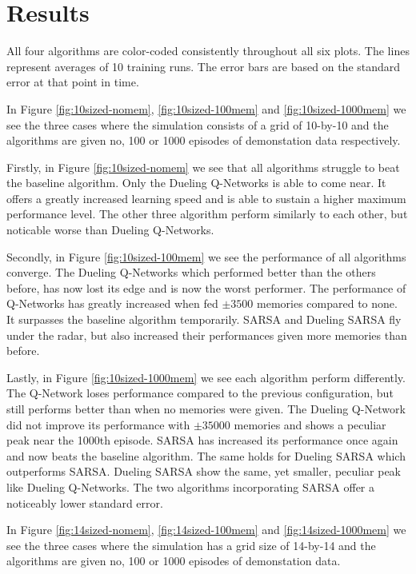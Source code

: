 
\section{Results}
All four algorithms are color-coded consistently throughout all six plots. The lines represent averages of 10 training runs. The error bars are based on the standard error at that point in time.

In Figure \ref{fig:10sized-nomem}, \ref{fig:10sized-100mem} and \ref{fig:10sized-1000mem} we see the three cases where the simulation consists of a grid of 10-by-10 and the algorithms are given no, 100 or 1000 episodes of demonstation data respectively.

Firstly, in Figure \ref{fig:10sized-nomem} we see that all algorithms struggle to beat the baseline algorithm. Only the Dueling Q-Networks is able to come near. It offers a greatly increased learning speed and is able to sustain a higher maximum performance level. The other three algorithm perform similarly to each other, but noticable worse than Dueling Q-Networks.

Secondly, in Figure \ref{fig:10sized-100mem} we see the performance of all algorithms converge. The Dueling Q-Networks which performed better than the others before, has now lost its edge and is now the worst performer. The performance of Q-Networks has greatly increased when fed $\pm 3500$ memories compared to none. It surpasses the baseline algorithm temporarily. SARSA and Dueling SARSA fly under the radar, but also increased their performances given more memories than before.

Lastly, in Figure \ref{fig:10sized-1000mem} we see each algorithm perform differently. The Q-Network loses performance compared to the previous configuration, but still performs better than when no memories were given. The Dueling Q-Network did not improve its performance with $\pm 35000$ memories and shows a peculiar peak near the 1000th episode. SARSA has increased its performance once again and now beats the baseline algorithm. The same holds for Dueling SARSA which outperforms SARSA. Dueling SARSA show the same, yet smaller, peculiar peak like Dueling Q-Networks. The two algorithms incorporating SARSA offer a noticeably lower standard error.

In Figure \ref{fig:14sized-nomem}, \ref{fig:14sized-100mem} and \ref{fig:14sized-1000mem} we see the three cases where the simulation has a grid size of 14-by-14 and the algorithms are given no, 100 or 1000 episodes of demonstation data.


